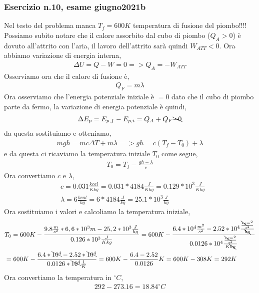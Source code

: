         \subsubsection{Esercizio n.10, esame giugno2021b}
            Nel testo del problema manca $T_f = 600K$ temperatura di fusione del piombo!!!!\\
            Possiamo subito notare che il calore assorbito dal cubo di piombo ($Q_A > 0$) è dovuto all'attrito con l'aria, il lavoro dell'attrito sarà quindi $W_{ATT} < 0$. Ora abbiamo variazione di energia interna,
            \begin{align*}
                \Delta U = Q - W = 0 => Q_A = -W_{ATT}
            \end{align*}
            Osserviamo ora che il calore di fusione è,
            \begin{align*}
                Q_F = m\lambda
            \end{align*}
            Ora osserviamo che l'energia potenziale iniziale è $=0$ dato che il cubo di piombo parte da fermo, la variazione di energia potenziale è quindi,
            \begin{align*}
                \Delta E_p = E_{p,f} - E_{p,i} = Q_A + Q_F \bcancel{- 0}
            \end{align*}
            da questa sostituiamo e otteniamo,
            \begin{align*}
                mgh = mc\Delta T + m\lambda => gh = c(T_f - T_0) + \lambda
            \end{align*}
            e da questa ci ricaviamo la temperatura iniziale $T_0$ come segue,
            \begin{align*}
                T_0 = T_f - \frac{gh - \lambda}{c}
            \end{align*}
            Ora convertiamo $c$ e $\lambda$,
            \begin{align*}
                &c=0.031\frac{kcal}{Kkg}= 0.031*4184\frac{J}{Kkg}= 0.129*10^3\frac{J}{Kkg}\\
                &\lambda=6\frac{kcal}{kg}=6*4184\frac{J}{kg}=25.1*10^3\frac{J}{kg}
            \end{align*}
            Ora sostituiamo i valori e calcoliamo la temperatura iniziale,
            \begin{align*}
                &T_0 = 600K - \frac{9.8\frac{m}{s^2}*6,6*10^3m - 25,2*10^3 \frac{J}{kg}}{0.126* 10^3\frac{J}{Kkg}}= 600K - \frac{6.4*10^4\frac{m^2}{s^2} - 2.52* 10^4 \frac{\frac{\bcancel{kg}m^2}{s^2}}{\bcancel{kg}}}{0.0126*10^4\frac{\frac{\bcancel{kg}m^2}{s^2}}{K\bcancel{kg}}}\\
                &= 600K - \frac{6.4*\bcancel{10^4} - 2.52* \bcancel{10^4}}{0.0126*\bcancel{10^4}\frac{1}{K}} = 600K - \frac{6.4 - 2.52}{0.0126}K = 600K - 308K = 292K
            \end{align*}
            Ora convertiamo la temperatura in $^{\circ}C$,
            \begin{align*}
                292 - 273.16 = 18.84^{\circ}C
            \end{align*}
